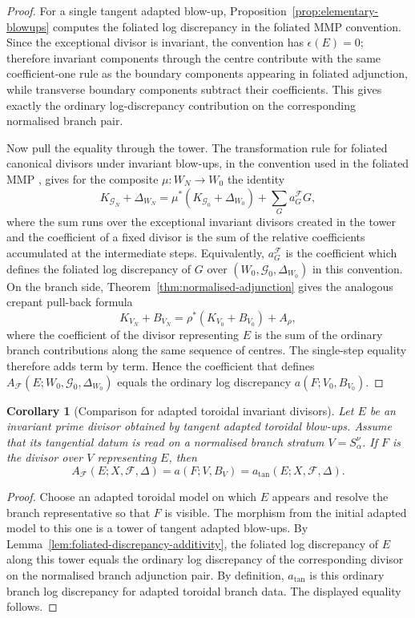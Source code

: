 \documentclass[11pt]{amsart}
\numberwithin{equation}{section}
\theoremstyle{plain}
\newtheorem{Corollary}[Theorem]{Corollary}
\theoremstyle{definition}
\newcommand{\AF}{A_{\mathcal F}}
\newcommand{\cF}{\mathcal F}
\newcommand{\cG}{\mathcal G}
\begin{document}
\begin{proof}
For a single tangent adapted blow-up, Proposition~\ref{prop:elementary-blowups}
computes the foliated log discrepancy in the foliated MMP convention.  Since
the exceptional divisor is invariant, the convention has $\epsilon(E)=0$;
therefore invariant components through the centre contribute with the same
coefficient-one rule as the boundary components appearing in foliated
adjunction, while transverse boundary components subtract their coefficients.
This gives exactly the ordinary log-discrepancy contribution on the
corresponding normalised branch pair.

Now pull the equality through the tower.  The transformation rule for
foliated canonical divisors under invariant blow-ups, in the convention used
in the foliated MMP \cite{CSMMP,SS,CSAdj}, gives for the composite
$\mu:W_N\to W_0$ the identity
\[
K_{\cG_N}+\Delta_{W_N}
=
\mu^*(K_{\cG_0}+\Delta_{W_0})
+
\sum_G a_G^{\mathcal F}G,
\]
where the sum runs over the exceptional invariant divisors created in the
tower and the coefficient of a fixed divisor is the sum of the relative
coefficients accumulated at the intermediate steps.  Equivalently,
$a_G^{\mathcal F}$ is the coefficient which defines the foliated log
discrepancy of $G$ over $(W_0,\cG_0,\Delta_{W_0})$ in this convention.
On the branch side, Theorem~\ref{thm:normalised-adjunction} gives the
analogous crepant pull-back formula
\[
K_{V_N}+B_{V_N}=\rho^*(K_{V_0}+B_{V_0})+A_\rho,
\]
where the coefficient of the divisor representing $E$ is the sum of the
ordinary branch contributions along the same sequence of centres.  The
single-step equality therefore adds term by term.  Hence the coefficient that
defines $\AF(E;W_0,\cG_0,\Delta_{W_0})$ equals the ordinary log discrepancy
$a(F;V_0,B_{V_0})$.
\end{proof}

\begin{Corollary}[Comparison for adapted toroidal invariant divisors]
\label{cor:foliated-comparison-tower}
Let $E$ be an invariant prime divisor obtained by tangent adapted toroidal
blow-ups.  Assume that its tangential datum is read on a normalised branch
stratum $V=S_\alpha^\nu$.  If $F$ is the divisor over $V$ representing $E$,
then
\[
\AF(E;X,\cF,\Delta)=a(F;V,B_V)=a_{\tan}(E;X,\cF,\Delta).
\]
\end{Corollary}

\begin{proof}
Choose an adapted toroidal model on which $E$ appears and resolve the branch
representative so that $F$ is visible.  The morphism from the initial adapted
model to this one is a tower of tangent adapted blow-ups.  By
Lemma~\ref{lem:foliated-discrepancy-additivity}, the foliated log discrepancy
of $E$ along this tower equals the ordinary log discrepancy of the
corresponding divisor on the normalised branch adjunction pair.  By definition,
$a_{\tan}$ is this ordinary branch log discrepancy for adapted toroidal branch
data.  The displayed equality follows.
\end{proof}
\end{document}
